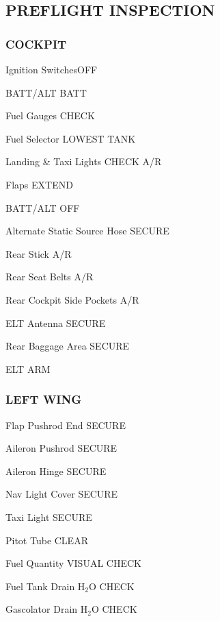 \begin{multicols}{2}

\subsection*{PREFLIGHT INSPECTION }

\subsubsection*{COCKPIT}
\begin{enumerate*}
\item Ignition Switches\dotfill OFF
\item BATT/ALT \dotfill BATT
\item Fuel Gauges \dotfill CHECK
\item Fuel Selector \dotfill LOWEST TANK
\item Landing \& Taxi Lights \dotfill CHECK A/R
\item Flaps \dotfill EXTEND
\item BATT/ALT \dotfill OFF
\item Alternate Static Source Hose \dotfill SECURE
\item Rear Stick \dotfill A/R 
\item Rear Seat Belts \dotfill A/R
\item Rear Cockpit Side Pockets \dotfill A/R
\item ELT Antenna \dotfill SECURE
\item Rear Baggage Area \dotfill SECURE
\item ELT \dotfill ARM
\end{enumerate*}

\subsubsection*{LEFT WING }
\begin{enumerate*}
\item Flap Pushrod End \dotfill SECURE
\item Aileron Pushrod \dotfill SECURE
\item Aileron Hinge \dotfill SECURE
\item Nav Light Cover \dotfill SECURE
\item Taxi Light \dotfill SECURE
\item Pitot Tube \dotfill CLEAR
\item Fuel Quantity \dotfill VISUAL CHECK
\item Fuel Tank Drain \dotfill $\mathrm{H_{2}O}$ CHECK
\item Gascolator Drain \dotfill $\mathrm{H_{2}O}$ CHECK
\end{enumerate*}


\end{multicols}
